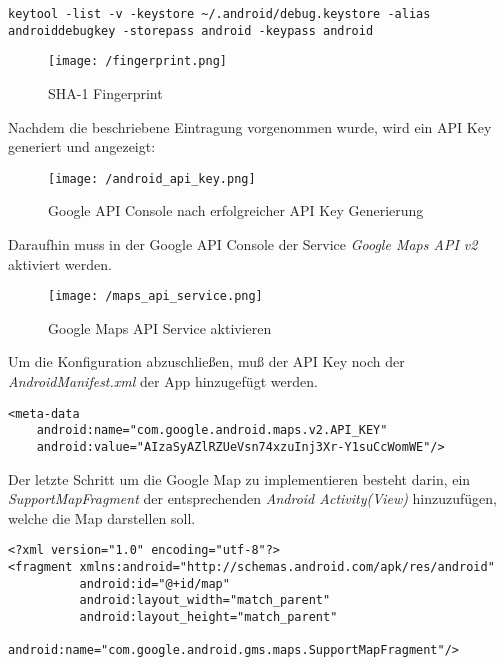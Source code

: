 \begin{lstlisting}[caption={Fingerprint Ausgabe},label=lst:FingerprintOutput]
keytool -list -v -keystore ~/.android/debug.keystore -alias androiddebugkey -storepass android -keypass android
\end{lstlisting}

\begin{figure}[H]
\centering
\texttt{[image: /fingerprint.png]}
\caption[User Interface: SHA-1 Fingerprint]{SHA-1 Fingerprint}
\label{fig:fingerprint}
\end{figure}
\bigskip
Nachdem die beschriebene Eintragung vorgenommen wurde, wird ein API Key generiert und angezeigt:

\begin{figure}[H]
\centering
\texttt{[image: /android\_api\_key.png]}
\caption{Google API Console nach erfolgreicher API Key Generierung}
\label{fig:apiKeyGen}
\end{figure}
\bigskip
Daraufhin muss in der Google API Console der Service \textit{Google Maps API v2} aktiviert werden.

\begin{figure}[H]
\centering
\texttt{[image: /maps\_api\_service.png]}
\caption{Google Maps API Service aktivieren}
\label{fig:mapsApiService}
\end{figure} 
\bigskip
Um die Konfiguration abzuschließen, muß der API Key noch der \textit{AndroidManifest.xml} der App hinzugefügt werden.

\begin{lstlisting}[caption={Google Map API Key hinzufügen},label=lst:MapApiKeyInsert]
<meta-data
    android:name="com.google.android.maps.v2.API_KEY"
    android:value="AIzaSyAZlRZUeVsn74xzuInj3Xr-Y1suCcWomWE"/>
\end{lstlisting}
\bigskip
Der letzte Schritt um die Google Map zu implementieren besteht darin, ein \textit{SupportMapFragment} der entsprechenden \textit{Android Activity(View)} hinzuzufügen, welche die Map darstellen soll.

\begin{lstlisting}[caption={SupportMapFragment hinzufügen},label=lst:SupportMapFragmentInsert]
<?xml version="1.0" encoding="utf-8"?>
<fragment xmlns:android="http://schemas.android.com/apk/res/android"
          android:id="@+id/map"
          android:layout_width="match_parent"
          android:layout_height="match_parent"
          android:name="com.google.android.gms.maps.SupportMapFragment"/>
\end{lstlisting}

